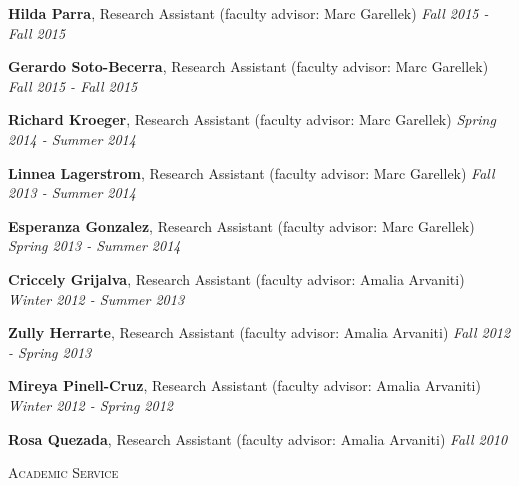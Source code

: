 \documentclass[9pt]{article}
\newenvironment{changemargin}[2]{%
  \begin{list}{}{%
    \setlength{\topsep}{0pt}%
    \setlength{\leftmargin}{#1}%
    \setlength{\rightmargin}{#2}%
    \setlength{\listparindent}{\parindent}%
    \setlength{\itemindent}{\parindent}%
    \setlength{\parsep}{\parskip}%
  }%
  \item[]}{\end{list}
}
\newcommand{\lineover}{
	\begin{changemargin}{-0.05in}{-0.05in}
		\vspace*{-8pt}
		\hrulefill \\
		\vspace*{-2pt}
	\end{changemargin}
}
\newcommand{\header}[1]{
	\begin{changemargin}{-0.5in}{-0.5in}
		\scshape{#1}\\
  	\lineover
	\end{changemargin}
}
\newenvironment{body} {
	\vspace*{-16pt}
	\begin{changemargin}{-0.25in}{-0.5in}
  }	
	{\end{changemargin}
}
\begin{document}
\begin{body}
	\vspace{14pt}
	
	\textbf{Hilda Parra}, Research Assistant (faculty advisor: Marc Garellek) \hfill \emph{Fall 2015 - Fall 2015}\\
	\medskip
	
	\textbf{Gerardo Soto-Becerra}, Research Assistant (faculty advisor: Marc Garellek) \hfill \emph{Fall 2015 - Fall 2015}\\
	\medskip

	\textbf{Richard Kroeger}, Research Assistant (faculty advisor: Marc Garellek) \hfill \emph{Spring 2014 - Summer 2014}\\
	\medskip

	\textbf{Linnea Lagerstrom}, Research Assistant (faculty advisor: Marc Garellek) \hfill \emph{Fall 2013 - Summer 2014}\\
	\medskip

	\textbf{Esperanza Gonzalez}, Research Assistant (faculty advisor: Marc Garellek) \hfill \emph{Spring 2013 - Summer 2014}\\
	\medskip
	
	\textbf{Criccely Grijalva}, Research Assistant (faculty advisor: Amalia Arvaniti) \hfill \emph{Winter 2012 - Summer 2013}\\
	\medskip

	\textbf{Zully Herrarte}, Research Assistant (faculty advisor: Amalia Arvaniti) \hfill \emph{Fall 2012 - Spring 2013}\\
	\medskip
	
	\textbf{Mireya Pinell-Cruz}, Research Assistant (faculty advisor: Amalia Arvaniti) \hfill \emph{Winter 2012 - Spring 2012}\\
	\medskip
	
	\textbf{Rosa Quezada}, Research Assistant (faculty advisor: Amalia Arvaniti) \hfill \emph{Fall 2010}\\
	
\end{body}

\smallskip


\header{Academic Service}
\end{document}
